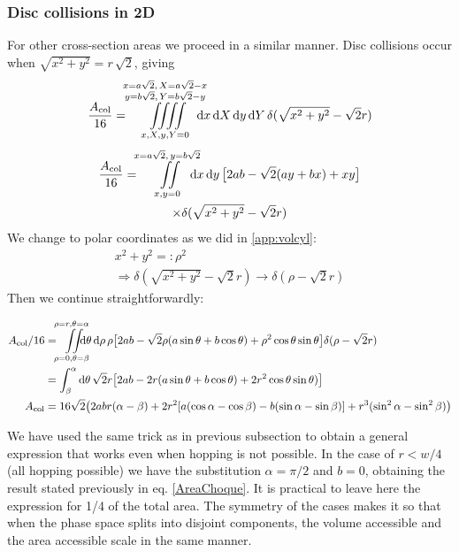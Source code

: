 \documentclass[superscriptaddress,pre,reprint,showpacs,twocolumn]{revtex4-1}
\newcommand{\rd}[1]{\mathrm{d}{#1} \,}
\begin{document}
  \subsubsection{Disc collisions in 2D}
  For other cross-section areas we proceed in a similar manner. 
  Disc collisions occur when $\sqrt{x^2 + y^2} = r \, \sqrt{2}$, giving
  \begin{equation}
    \frac{A_\text{col}}{16}  = \iiiint\limits_
         {x,X,y,Y=0}^
         {\substack{x=a\sqrt{2},\, X=a\sqrt{2}-x
             \\ y =  b\sqrt{2},\,  Y=b\sqrt{2}-y}}
         \mkern-18mu
    \rd x \rd X \rd y \rd Y
    \delta (\sqrt{x^2+y^2}-\sqrt{2}r)
  \end{equation}
  \begin{multline}
    \frac{A_\text{col}}{16}  = \iint \limits_{x,y=0}^
      {x=a\sqrt{2},\, y=b\sqrt{2}}
    \mkern-18mu \rd x \rd y 
    \bigl[ 2ab-\sqrt{2}(ay+bx)+xy \bigr] \\
    \times
    \delta (\sqrt{x^2+y^2}-\sqrt{2}r)\\
    \end{multline}
  We change to polar coordinates as we did in \ref{app:volcyl}:
  \begin{align}
    x^2+y^2 =: \rho^2 \\   \Rightarrow   \delta(\sqrt{x^2+y^2}-\sqrt{2}r) \rightarrow
    \delta(\rho-\sqrt{2}r)   
    \end{align}
  Then we continue straightforwardly:
  \begin{widetext}
    \begin{align}\label{app:colgeneral}
      A_\text{col}/16 & =\iint\limits_{\rho=0, \theta=\beta}^{\rho=r, \theta=\alpha}
      \mkern-18mu
    \rd \theta \rd \rho \rho
    \bigl[2ab-\sqrt{2}\rho(a\sin\theta+b\cos\theta)+\rho^2\cos\theta\sin\theta
      \bigr]
    \delta(\rho-\sqrt{2}r) \\
    &=\int_\beta^\alpha \rd \theta \sqrt{2}r
    \bigl[
      2ab-2r(a\sin\theta+b\cos\theta)+2r^2\cos\theta\sin\theta)
      \bigr] \\
    A_\text{col} & = 16\sqrt{2} \bigl( 2abr(\alpha-\beta)
    + 2r^2 [a (\cos \alpha-\cos\beta) -b (\sin\alpha -\sin\beta)]
     + r^3(\sin^2 \alpha -\sin^2\beta) \bigr)
    \end{align}
    \end{widetext}
    We have used the same trick as in previous subsection to obtain a general expression
    that works even when hopping is not possible.
    In the case of $r<w/4$ (all hopping possible)
    we have the substitution $\alpha=\pi/2$ and $b=0$,
    obtaining the result stated previously
    in eq. \ref{AreaChoque}. It is practical to leave here the expression for 1/4 of the
    total area. The symmetry of the cases makes it so that when the phase space splits
    into disjoint components, the volume accessible and the area accessible scale in
    the same manner.
    
\end{document}
